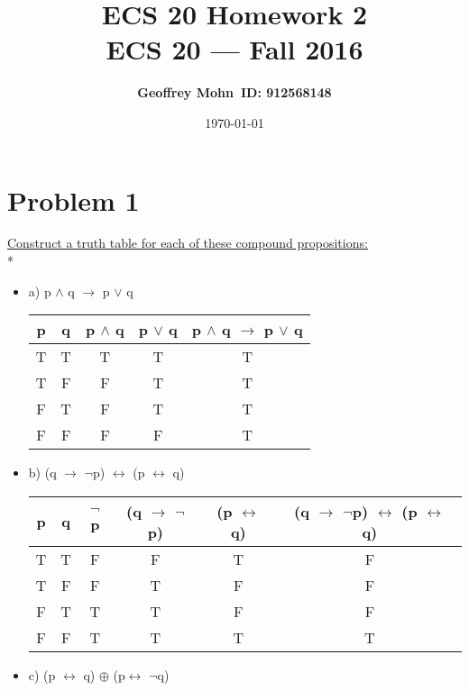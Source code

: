 \documentclass[11pt]{article}
\title{\bf ECS 20 Homework 2\\[2ex] 
	\rm\normalsize ECS 20 --- Fall 2016}
\date{\today}
\author{\bf Geoffrey Mohn\ ID: 912568148}
\begin{document}
	\maketitle
	
	
	\section*{Problem 1} 
	{\underline{Construct a truth table for each of these compound propositions:}}\\*\\

	\begin{itemize}
		\item [] a) 
	p $\wedge$ q $\rightarrow$ p $\vee$ q
	
	\begin{center}
		\begin{tabular}{||c | c | c | c | c||} 
			\hline
			p & q & p $\wedge$ q & p $\vee$ q & p $\wedge$ q $\rightarrow$ p $\vee$ q \\ [0.5ex] 
			\hline\hline
			T & T & T & T & T \\ 
			\hline
			T & F & F & T & T\\
			\hline
			F & T & F & T & T\\
			\hline
			F & F & F & F & T\\
			\hline
			
		\end{tabular}
	\end{center}
	
		\item [] b)
		(q $\rightarrow$ $\neg$p) $\leftrightarrow$ (p $\leftrightarrow$ q)
		
	\begin{center}
		\begin{tabular}{||c | c | c | c | c | c||}
			\hline
			p & q & $\neg$p & (q $\rightarrow$ $\neg$p) & (p $\leftrightarrow$ q) & (q $\rightarrow$ $\neg$p) $\leftrightarrow$ (p $\leftrightarrow$ q)\\
			[0.5ex]
			\hline\hline
			T & T & F & F & T & F\\
			\hline
			T & F & F & T & F & F\\
			\hline
			F & T & T & T & F & F\\
			\hline
			F & F & T & T & T & T\\
			\hline
		\end{tabular}
	\end{center}
		\item [] c)
	(p $\leftrightarrow$ q) $\oplus$ (p$\leftrightarrow$ $\neg$q)
	\end{itemize}
\end{document}
